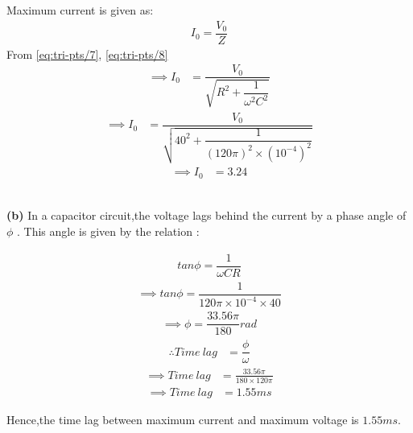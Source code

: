 \documentclass[journal,12pt,twocolumn]{IEEEtran}
\theoremstyle{remark}
\begin{document}
Maximum current is given as:
\begin{align}
\label{eq:tri-pts/8}I_0=\dfrac{V_0}{Z}
\end{align}
From \eqref{eq:tri-pts/7}, \eqref{eq:tri-pts/8}\\
\begin{align}
	\label{eq:tri-pts/9}\implies I_0 &=\dfrac{V_0}{\sqrt{R^2 + \dfrac{1}{\omega^2C^2}}}
\end{align}
\begin{align}
	\label{eq:tri-pts/10}\implies I_0 &=\dfrac{V_0}{\sqrt{40^2 + \dfrac{1}{{(120\pi)^2 \times (10^{-4})^2}}}}
\end{align}
\begin{align}
	\label{eq:tri-pts/12}\implies I_0 &=3.24
\end{align}
\\

\begin{flushleft}\textbf{(b)} In a capacitor circuit,the voltage lags behind the current by a phase angle of $\phi$ . This angle is given by the relation
:\\
\end{flushleft}
\begin{align}
	\label{eq:tri-pts/13} tan\phi=\dfrac{1}{\omega CR}
\end{align}
\begin{align}
	\label{eq:tri-pts/14}\implies tan\phi=\dfrac{1}{120\pi \times 10^{-4} \times 40}
\end{align}
\begin{align}
	\label{eq:tri-pts/15}\implies \phi =\dfrac{33.56\pi}{180}rad
\end{align}
\begin{align}
	\label{eq:tri-pts/16} \therefore Time\: lag &=\dfrac{\phi}{\omega}
\end{align}
\begin{align}
	\label{eq:tri-pts/17}\implies Time\: lag &=\frac{33.56\pi}{180 \times 120\pi}
\end{align}
\begin{align}
	\label{eq:tri-pts/18}\implies Time\: lag &=1.55ms
\end{align}

Hence,the time lag between maximum current and maximum voltage is $1.55ms$.
\end{document}
